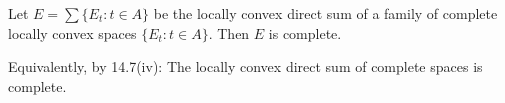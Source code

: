 Let $E = \sum \{E_t : t \in A\}$ be the locally convex direct sum of a family of complete locally convex spaces $\{E_t : t \in A\}$. Then $E$ is complete.

Equivalently, by 14.7(iv): The locally convex direct sum of complete spaces is complete.
